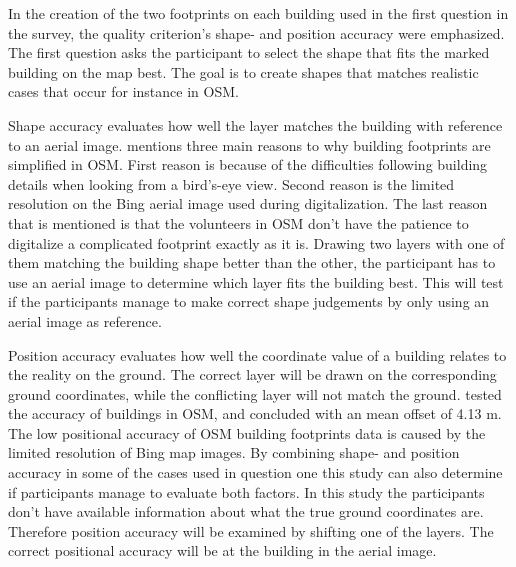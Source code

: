 

In the creation of the two footprints on each building used in the first question in the survey, the quality criterion's shape- and position accuracy were emphasized. The first question asks the participant to select the shape that fits the marked building on the map best. The goal is to create shapes that matches realistic cases that occur for instance in OSM. 

Shape accuracy evaluates how well the layer matches the building with reference to an aerial image. \cite{Fan2014} mentions three main reasons to why building footprints are simplified in OSM. First reason is because of the difficulties following building details when looking from a bird's-eye view. Second reason is the limited resolution on the Bing aerial image used during digitalization. The last reason that is mentioned is that the volunteers in OSM don't have the patience to digitalize a complicated footprint exactly as it is. Drawing two layers with one of them matching the building shape better than the other, the participant has to use an aerial image to determine which layer fits the building best. This will test if the participants manage to make correct shape judgements by only using an aerial image as reference. 

Position accuracy evaluates how well the coordinate value of a building relates to the reality on the ground. The correct layer will be drawn on the corresponding ground coordinates, while the conflicting layer will not match the ground. \cite{Fan2014} tested the accuracy of buildings in OSM, and concluded with an mean offset of 4.13 m. The low positional accuracy of OSM building footprints data is caused by the limited resolution of Bing map images. By combining shape- and position accuracy in some of the cases used in question one this study can also determine if participants manage to evaluate both factors. In this study the participants don't have available information about what the true ground coordinates are. Therefore position accuracy will be examined by shifting one of the layers. The correct positional accuracy will be at the building in the aerial image. 

